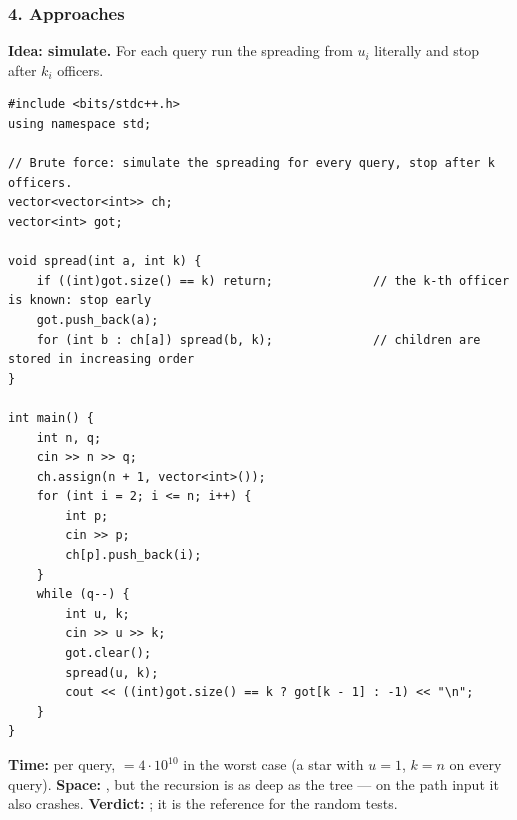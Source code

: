 \subsubsection*{4. Approaches}

\begin{bruteforcebox}
\textbf{Idea: simulate.} For each query run the spreading from $u_i$ literally and stop after $k_i$ officers.

\begin{lstlisting}[style=cpp]
#include <bits/stdc++.h>
using namespace std;

// Brute force: simulate the spreading for every query, stop after k officers.
vector<vector<int>> ch;
vector<int> got;

void spread(int a, int k) {
    if ((int)got.size() == k) return;              // the k-th officer is known: stop early
    got.push_back(a);
    for (int b : ch[a]) spread(b, k);              // children are stored in increasing order
}

int main() {
    int n, q;
    cin >> n >> q;
    ch.assign(n + 1, vector<int>());
    for (int i = 2; i <= n; i++) {
        int p;
        cin >> p;
        ch[p].push_back(i);
    }
    while (q--) {
        int u, k;
        cin >> u >> k;
        got.clear();
        spread(u, k);
        cout << ((int)got.size() == k ? got[k - 1] : -1) << "\n";
    }
}
\end{lstlisting}

\begin{complexitybox}
\textbf{Time:}  per query,  $= 4\cdot10^{10}$ in the worst case (a star with $u = 1$, $k = n$ on every query). \textbf{Space:} , but the recursion is as deep as the tree --- on the path input it also crashes. \textbf{Verdict:} \tle{}; it is the reference for the random tests.
\end{complexitybox}
\end{bruteforcebox}

